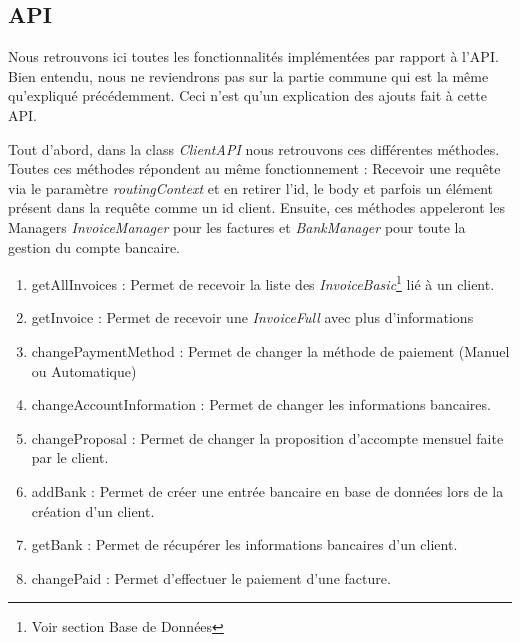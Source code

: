 \subsection{API}

\begin{flushleft}
Nous retrouvons ici toutes les fonctionnalités implémentées par rapport à l'API. Bien entendu, nous ne reviendrons pas sur la partie commune qui est la même qu'expliqué précédemment. Ceci n'est qu'un explication des ajouts fait à cette API.
\end{flushleft}

\begin{flushleft}
    Tout d'abord, dans la class \textit{ClientAPI} nous retrouvons ces différentes méthodes. Toutes ces méthodes répondent au même fonctionnement : Recevoir une requête via le paramètre \textit{routingContext} et en retirer l'id, le body et parfois un élément présent dans la requête comme un id client. Ensuite, ces méthodes appeleront les Managers \textit{InvoiceManager} pour les factures et \textit{BankManager} pour toute la gestion du compte bancaire.
\end{flushleft}

\begin{enumerate}
    \item getAllInvoices :\newline
    Permet de recevoir la liste des \textit{InvoiceBasic}\footnote{Voir section Base de Données} lié à un client.
    \item getInvoice :\newline
    Permet de recevoir une \textit{InvoiceFull} avec plus d'informations
    \item changePaymentMethod :\newline
    Permet de changer la méthode de paiement (Manuel ou Automatique)
    \item changeAccountInformation :\newline
    Permet de changer les informations bancaires.
    \item changeProposal :\newline
    Permet de changer la proposition d'accompte mensuel faite par le client.
    \item addBank :\newline
    Permet de créer une entrée bancaire en base de données lors de la création d'un client.
    \item getBank :\newline
    Permet de récupérer les informations bancaires d'un client.
    \item changePaid :\newline
    Permet d'effectuer le paiement d'une facture.
\end{enumerate}


